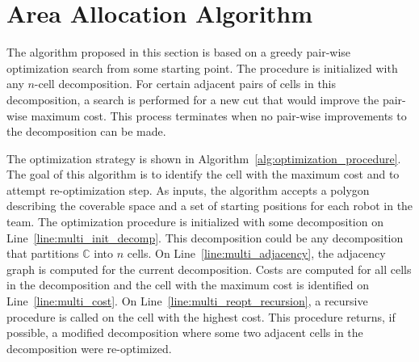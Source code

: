 \documentclass[../main.tex]{subfiles}
\begin{document}







\section{Area Allocation Algorithm}
\label{section:multi_algorithm}

The algorithm proposed in this section is based on a greedy pair-wise optimization search from some starting point. The procedure is initialized with any $n$-cell decomposition. For certain adjacent pairs of cells in this decomposition, a search is performed for a new cut that would improve the pair-wise maximum cost. This process terminates when no pair-wise improvements to the decomposition can be made. %

The optimization strategy is shown in Algorithm~\ref{alg:optimization_procedure}. The goal of this algorithm is to identify the cell with the maximum cost and to attempt re-optimization step. As inputs, the algorithm accepts a polygon describing the coverable space and a set of starting positions for each robot in the team. The optimization procedure is initialized with some decomposition on Line~\ref{line:multi_init_decomp}. This decomposition could be any decomposition that partitions $\mathbb{C}$ into $n$ cells. On Line~\ref{line:multi_adjacency}, the adjacency graph is computed for the current decomposition. Costs are computed for all cells in the decomposition and the cell with the maximum cost is identified on Line~\ref{line:multi_cost}. On Line~\ref{line:multi_reopt_recursion}, a recursive procedure is called on the cell with the highest cost. This procedure returns, if possible, a modified decomposition where some two adjacent cells in the decomposition were re-optimized.
\end{document}
